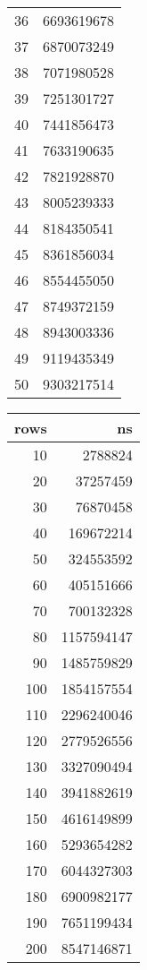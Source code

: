 \begin{figure}[H]
\begin{tabular}{r r}
        36 & 6693619678 \\
        37 & 6870073249 \\
        38 & 7071980528 \\
        39 & 7251301727 \\
        40 & 7441856473 \\
        41 & 7633190635 \\
        42 & 7821928870 \\
        43 & 8005239333 \\
        44 & 8184350541 \\
        45 & 8361856034 \\
        46 & 8554455050 \\
        47 & 8749372159 \\
        48 & 8943003336 \\
        49 & 9119435349 \\
        50 & 9303217514 \\
        \bottomrule
    \end{tabular}
    \quad
    \begin{tabular}{r r}
        \toprule
        \textbf{rows} & \textbf{ns} \\
        \midrule
        10 & 2788824 \\
        20 & 37257459 \\
        30 & 76870458 \\
        40 & 169672214 \\
        50 & 324553592 \\
        60 & 405151666 \\
        70 & 700132328 \\
        80 & 1157594147 \\
        90 & 1485759829 \\
        100 & 1854157554 \\
        110 & 2296240046 \\
        120 & 2779526556 \\
        130 & 3327090494 \\
        140 & 3941882619 \\
        150 & 4616149899 \\
        160 & 5293654282 \\
        170 & 6044327303 \\
        180 & 6900982177 \\
        190 & 7651199434 \\
        200 & 8547146871 \\

\end{tabular}
\end{figure}
